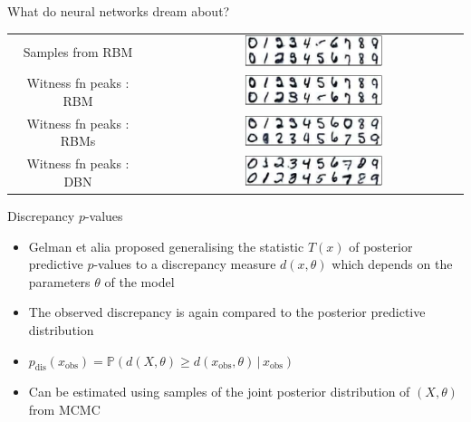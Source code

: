 \begin{frame}{What do neural networks dream about?}
  \begin{center}
    \begin{tabular}{ccc}
      Samples from RBM & $\,$ & \includegraphics[width=0.48\textwidth]{figures/rbm_samples} \\
      \pause
      Witness fn peaks : RBM & $\,$ & \includegraphics[width=0.48\textwidth]{figures/rbm_witness_troughs} \\
      \pause
      Witness fn peaks : RBMs & $\,$ & \includegraphics[width=0.48\textwidth]{figures/many_rbm_cond_witness_troughs} \\
      \pause
      Witness fn peaks : DBN & $\,$ & \includegraphics[width=0.48\textwidth]{figures/dbn_ft_cond_witness_troughs} \\
    \end{tabular}
  \end{center}
\end{frame}

\begin{frame}{Discrepancy $p$-values}
  \begin{itemize}
    \item Gelman et alia \cite{Gelman1996-ez} proposed generalising the statistic $T(x)$ of posterior predictive $p$-values to a discrepancy measure $d(x, \theta)$ which depends on the parameters $\theta$ of the model
    \vspace{\baselineskip}
    \pause
    \item The observed discrepancy is again compared to the posterior predictive distribution
    \vspace{\baselineskip}
    \pause
    \item $p_{\textrm{dis}}(x_{\textrm{obs}}) = \mathbb{P}(d(X,\theta) \geq d(x_{\textrm{obs}},\theta)\,|\,x_{\textrm{obs}})$
    \vspace{\baselineskip}
    \pause
    \item Can be estimated using samples of the joint posterior distribution of $(X, \theta)$ \eg from MCMC
  \end{itemize}
\end{frame}

